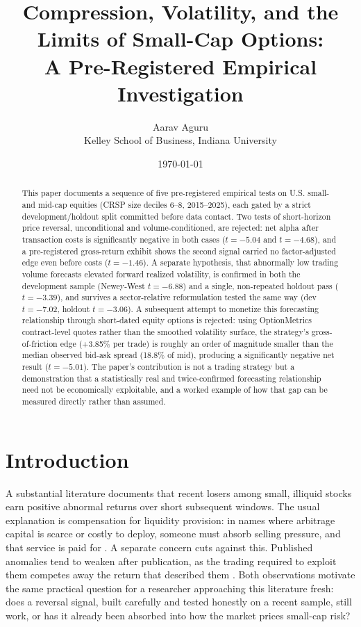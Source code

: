 \documentclass[11pt]{article}
\title{Compression, Volatility, and the Limits of Small-Cap Options: \\
A Pre-Registered Empirical Investigation}
\author{Aarav Aguru \\ Kelley School of Business, Indiana University}
\date{\today}
\begin{document}
\maketitle

\begin{abstract}
This paper documents a sequence of five pre-registered empirical tests on U.S. small- and mid-cap equities (CRSP size deciles 6--8, 2015--2025), each gated by a strict development/holdout split committed before data contact. Two tests of short-horizon price reversal, unconditional and volume-conditioned, are rejected: net alpha after transaction costs is significantly negative in both cases ($t = -5.04$ and $t = -4.68$), and a pre-registered gross-return exhibit shows the second signal carried no factor-adjusted edge even before costs ($t = -1.46$). A separate hypothesis, that abnormally low trading volume forecasts elevated forward realized volatility, is confirmed in both the development sample (Newey-West $t = -6.88$) and a single, non-repeated holdout pass ($t = -3.39$), and survives a sector-relative reformulation tested the same way (dev $t = -7.02$, holdout $t = -3.06$). A subsequent attempt to monetize this forecasting relationship through short-dated equity options is rejected: using OptionMetrics contract-level quotes rather than the smoothed volatility surface, the strategy's gross-of-friction edge (+3.85\% per trade) is roughly an order of magnitude smaller than the median observed bid-ask spread (18.8\% of mid), producing a significantly negative net result ($t = -5.01$). The paper's contribution is not a trading strategy but a demonstration that a statistically real and twice-confirmed forecasting relationship need not be economically exploitable, and a worked example of how that gap can be measured directly rather than assumed.
\end{abstract}

\section{Introduction}
A substantial literature documents that recent losers among small, illiquid stocks earn positive abnormal returns over short subsequent windows. The usual explanation is compensation for liquidity provision: in names where arbitrage capital is scarce or costly to deploy, someone must absorb selling pressure, and that service is paid for \citep{nagel2012, avramovchordiagoyal2006}. A separate concern cuts against this. Published anomalies tend to weaken after publication, as the trading required to exploit them competes away the return that described them \citep{mcleanpontiff2016}. Both observations motivate the same practical question for a researcher approaching this literature fresh: does a reversal signal, built carefully and tested honestly on a recent sample, still work, or has it already been absorbed into how the market prices small-cap risk?
\end{document}
